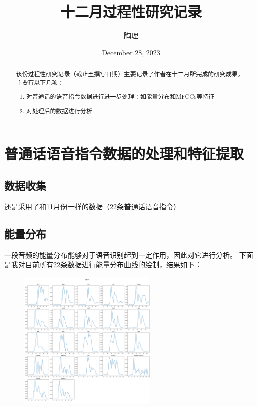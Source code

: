 \documentclass[lang=cn]{elegantpaper}
\title{十二月过程性研究记录}
\author{陶理}
\begin{document}
\date{December 28, 2023}
\maketitle

\begin{abstract}
    该份过程性研究记录（截止至撰写日期）主要记录了作者在十二月所完成的研究成果。主要有以下几项：
    \begin{enumerate}
        \item 对普通话的语音指令数据进行进一步处理：如能量分布和MFCCs等特征
        \item 对处理后的数据进行分析
    \end{enumerate}
\end{abstract}

\section{普通话语音指令数据的处理和特征提取}
\subsection{数据收集}
还是采用了和11月份一样的数据（22条普通话语音指令）
\subsection{能量分布}
一段音频的能量分布能够对于语音识别起到一定作用，因此对它进行分析。
下面是我对目前所有22条数据进行能量分布曲线的绘制，结果如下：
\begin{figure}[h]
    \centering
    \includegraphics[width=0.59\textwidth]{energydistribution.png}
\end{figure}
\end{document}
